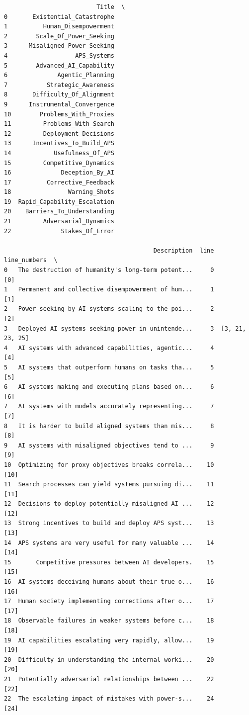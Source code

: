\documentclass[
  11pt,
  letterpaper,
]{book}
\begin{document}
\begin{verbatim}
                          Title  \
0       Existential_Catastrophe   
1          Human_Disempowerment   
2        Scale_Of_Power_Seeking   
3      Misaligned_Power_Seeking   
4                   APS_Systems   
5        Advanced_AI_Capability   
6              Agentic_Planning   
7           Strategic_Awareness   
8       Difficulty_Of_Alignment   
9      Instrumental_Convergence   
10        Problems_With_Proxies   
11         Problems_With_Search   
12         Deployment_Decisions   
13      Incentives_To_Build_APS   
14            Usefulness_Of_APS   
15         Competitive_Dynamics   
16              Deception_By_AI   
17          Corrective_Feedback   
18                Warning_Shots   
19  Rapid_Capability_Escalation   
20    Barriers_To_Understanding   
21         Adversarial_Dynamics   
22              Stakes_Of_Error   

                                          Description  line     line_numbers  \
0   The destruction of humanity's long-term potent...     0              [0]   
1   Permanent and collective disempowerment of hum...     1              [1]   
2   Power-seeking by AI systems scaling to the poi...     2              [2]   
3   Deployed AI systems seeking power in unintende...     3  [3, 21, 23, 25]   
4   AI systems with advanced capabilities, agentic...     4              [4]   
5   AI systems that outperform humans on tasks tha...     5              [5]   
6   AI systems making and executing plans based on...     6              [6]   
7   AI systems with models accurately representing...     7              [7]   
8   It is harder to build aligned systems than mis...     8              [8]   
9   AI systems with misaligned objectives tend to ...     9              [9]   
10  Optimizing for proxy objectives breaks correla...    10             [10]   
11  Search processes can yield systems pursuing di...    11             [11]   
12  Decisions to deploy potentially misaligned AI ...    12             [12]   
13  Strong incentives to build and deploy APS syst...    13             [13]   
14  APS systems are very useful for many valuable ...    14             [14]   
15       Competitive pressures between AI developers.    15             [15]   
16  AI systems deceiving humans about their true o...    16             [16]   
17  Human society implementing corrections after o...    17             [17]   
18  Observable failures in weaker systems before c...    18             [18]   
19  AI capabilities escalating very rapidly, allow...    19             [19]   
20  Difficulty in understanding the internal worki...    20             [20]   
21  Potentially adversarial relationships between ...    22             [22]   
22  The escalating impact of mistakes with power-s...    24             [24]   


\end{verbatim}
\end{document}
